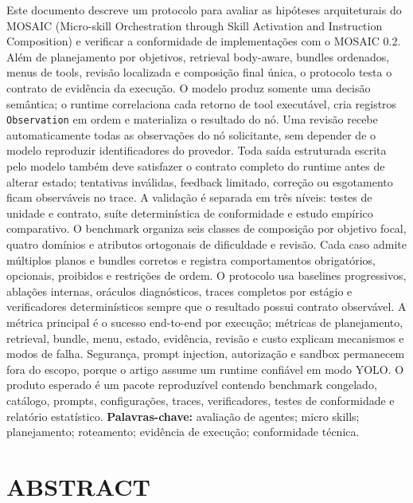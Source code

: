 \documentclass[12pt,a4paper]{article}
\begin{document}
Este documento descreve um protocolo para avaliar as hipóteses arquiteturais do MOSAIC (Micro-skill Orchestration through Skill Activation and Instruction Composition) e verificar a conformidade de implementações com o MOSAIC 0.2. Além de planejamento por objetivos, retrieval body-aware, bundles ordenados, menus de tools, revisão localizada e composição final única, o protocolo testa o contrato de evidência da execução. O modelo produz somente uma decisão semântica; o runtime correlaciona cada retorno de tool executável, cria registros \texttt{Observation} em ordem e materializa o resultado do nó. Uma revisão recebe automaticamente todas as observações do nó solicitante, sem depender de o modelo reproduzir identificadores do provedor. Toda saída estruturada escrita pelo modelo também deve satisfazer o contrato completo do runtime antes de alterar estado; tentativas inválidas, feedback limitado, correção ou esgotamento ficam observáveis no trace. A validação é separada em três níveis: testes de unidade e contrato, suíte determinística de conformidade e estudo empírico comparativo. O benchmark organiza seis classes de composição por objetivo focal, quatro domínios e atributos ortogonais de dificuldade e revisão. Cada caso admite múltiplos planos e bundles corretos e registra comportamentos obrigatórios, opcionais, proibidos e restrições de ordem. O protocolo usa baselines progressivos, ablações internas, oráculos diagnósticos, traces completos por estágio e verificadores determinísticos sempre que o resultado possui contrato observável. A métrica principal é o sucesso end-to-end por execução; métricas de planejamento, retrieval, bundle, menu, estado, evidência, revisão e custo explicam mecanismos e modos de falha. Segurança, prompt injection, autorização e sandbox permanecem fora do escopo, porque o artigo assume um runtime confiável em modo YOLO. O produto esperado é um pacote reproduzível contendo benchmark congelado, catálogo, prompts, configurações, traces, verificadores, testes de conformidade e relatório estatístico. \textbf{Palavras-chave:} avaliação de agentes; micro skills; planejamento; roteamento; evidência de execução; conformidade técnica.



\section*{ABSTRACT}
\end{document}
